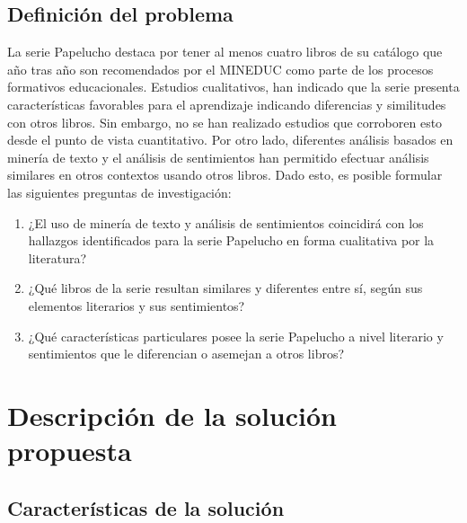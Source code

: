 
\newpage

\section{Definición del problema}\label{sec:problema}

La serie Papelucho destaca por tener al menos cuatro libros de su catálogo que año tras año son recomendados por el MINEDUC como parte de los procesos formativos educacionales. Estudios cualitativos, han indicado que la serie presenta características favorables para el aprendizaje indicando diferencias y similitudes con otros libros. Sin embargo, no se han realizado estudios que corroboren esto desde el punto de vista cuantitativo. Por otro lado, diferentes análisis basados en minería de texto y el análisis de sentimientos han permitido efectuar análisis similares en otros contextos usando otros libros. Dado esto, es posible formular las siguientes preguntas de investigación:

\begin{enumerate}
    \item ¿El uso de minería de texto y análisis de sentimientos coincidirá con los hallazgos identificados para la serie Papelucho en forma cualitativa por la literatura?
    \item ¿Qué libros de la serie resultan similares y diferentes entre sí, según sus elementos literarios y sus sentimientos?
    \item ¿Qué características particulares posee la serie Papelucho a nivel literario y sentimientos que le diferencian o asemejan a otros libros?
\end{enumerate}




\chapter{Descripción de la solución propuesta}   

\section{Características de la solución}

